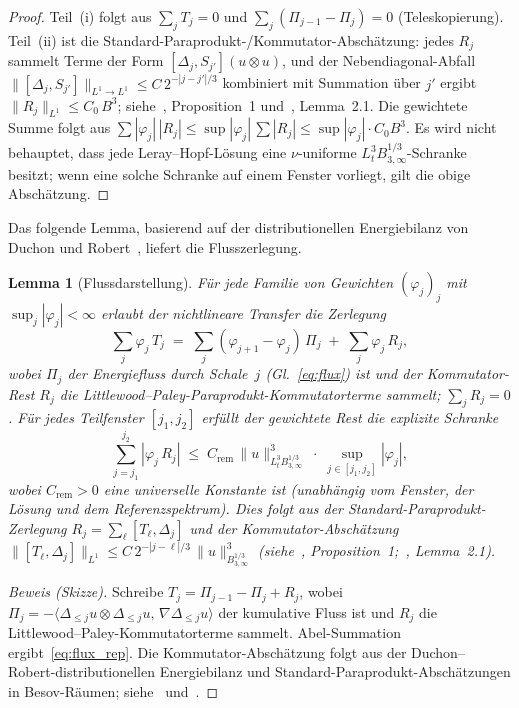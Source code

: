 \documentclass[12pt,a4paper]{article}
\theoremstyle{breakdef}
\theoremstyle{breakplain}
\newtheorem{lemma}[definition]{Lemma}
\theoremstyle{breakdef}
\begin{document}
\begin{proof}
Teil~(i) folgt aus $\sum_j T_j = 0$ und $\sum_j(\Pi_{j-1}-\Pi_j)=0$
(Teleskopierung). Teil~(ii) ist die Standard-Paraprodukt-/Kommutator-Abschätzung:
jedes $R_j$ sammelt Terme der Form $[\Delta_j, S_{j'}](u \otimes u)$,
und der Nebendiagonal-Abfall $\|[\Delta_j, S_{j'}]\|_{L^1 \to L^1}
\le C\,2^{-|j-j'|/3}$ kombiniert mit Summation über $j'$ ergibt
$\|R_j\|_{L^1} \le C_0\,B^3$; siehe~\cite{CET94}, Proposition~1
und~\cite{DR00}, Lemma~2.1. Die gewichtete Summe folgt aus
$\sum |{\varphi_j}|\,|{R_j}| \le \sup|\varphi_j|\,\sum|R_j|
  \le \sup|\varphi_j|\cdot C_0 B^3$. Es wird nicht behauptet, dass jede
Leray--Hopf-Lösung eine $\nu$-uniforme
$L^3_tB^{1/3}_{3,\infty}$-Schranke besitzt; wenn eine solche Schranke auf
einem Fenster vorliegt, gilt die obige Abschätzung.
\end{proof}

Das folgende Lemma, basierend auf der distributionellen Energiebilanz von
Duchon und Robert~\cite{DR00}, liefert die Flusszerlegung.

\begin{lemma}[Flussdarstellung]\label{lem:flux}
Für jede Familie von Gewichten $(\varphi_j)_j$ mit
$\sup_j |\varphi_j| < \infty$ erlaubt der nichtlineare Transfer die
Zerlegung
\begin{equation}\label{eq:flux_rep}
  \sum_j \varphi_j\,T_j
  \;=\;
  \sum_j (\varphi_{j+1} - \varphi_j)\,\Pi_j
  \;+\;
  \sum_j \varphi_j\,R_j,
\end{equation}
wobei $\Pi_j$ der Energiefluss durch Schale~$j$
(Gl.~\eqref{eq:flux}) ist und der Kommutator-Rest $R_j$ die
Littlewood--Paley-Paraprodukt-Kommutatorterme sammelt; $\sum_j R_j = 0$.
Für jedes Teilfenster $[j_1, j_2]$ erfüllt der gewichtete Rest die
\emph{explizite Schranke}
\begin{equation}\label{eq:remainder-bound}
  \sum_{j=j_1}^{j_2} |\varphi_j\,R_j|
  \;\le\;
  C_{\mathrm{rem}}\,\|u\|_{L^3_t B^{1/3}_{3,\infty}}^3
  \;\cdot\;
  \sup_{j \in [j_1,j_2]} |\varphi_j|,
\end{equation}
wobei $C_{\mathrm{rem}} > 0$ eine universelle Konstante ist (unabhängig
vom Fenster, der Lösung und dem Referenzspektrum). Dies folgt aus der
Standard-Paraprodukt-Zerlegung $R_j = \sum_{\ell} [T_\ell,
\Delta_j]$ und der Kommutator-Abschätzung $\|[T_\ell, \Delta_j]\|_{L^1}
\le C\,2^{-|j-\ell|/3}\,\|u\|_{B^{1/3}_{3,\infty}}^3$
(siehe~\cite{CET94}, Proposition~1;~\cite{DR00}, Lemma~2.1).
\end{lemma}

\begin{proof}[Beweis (Skizze)]
Schreibe $T_j = \Pi_{j-1} - \Pi_j + R_j$, wobei
$\Pi_j = -\langle \Delta_{\le j} u \otimes \Delta_{\le j} u,\,
\nabla \Delta_{\le j} u \rangle$ der kumulative Fluss ist
und $R_j$ die Littlewood--Paley-Kommutatorterme sammelt.
Abel-Summation ergibt~\eqref{eq:flux_rep}. Die Kommutator-Abschätzung
folgt aus der Duchon--Robert-distributionellen Energiebilanz und
Standard-Paraprodukt-Abschätzungen in Besov-Räumen;
siehe~\cite{DR00} und~\cite{CET94}.
\end{proof}
\end{document}

